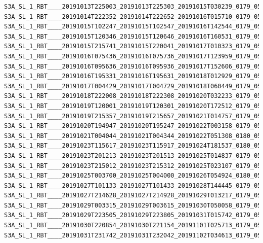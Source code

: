 \documentclass[sigplan,screen]{acmart}
\begin{document}
\begin{verbatim}
S3A_SL_1_RBT____20191013T225003_20191013T225303_20191015T030239_0179_050_201_0900_LN2_O_NT_003.hdf
S3A_SL_1_RBT____20191014T222352_20191014T222652_20191016T015710_0179_050_215_0900_LN2_O_NT_003.hdf
S3A_SL_1_RBT____20191015T102247_20191015T102547_20191016T142544_0179_050_222_1620_LN2_O_NT_003.hdf
S3A_SL_1_RBT____20191015T120346_20191015T120646_20191016T160531_0179_050_223_1620_LN2_O_NT_003.hdf
S3A_SL_1_RBT____20191015T215741_20191015T220041_20191017T010323_0179_050_229_0900_LN2_O_NT_003.hdf
S3A_SL_1_RBT____20191016T075436_20191016T075736_20191017T123959_0179_050_235_0360_LN2_O_NT_003.hdf
S3A_SL_1_RBT____20191016T095636_20191016T095936_20191017T152606_0179_050_236_1620_LN2_O_NT_003.hdf
S3A_SL_1_RBT____20191016T195331_20191016T195631_20191018T012929_0179_050_242_1080_LN2_O_NT_003.hdf
S3A_SL_1_RBT____20191017T004429_20191017T004729_20191018T060449_0179_050_245_0360_LN2_O_NT_003.hdf
S3A_SL_1_RBT____20191018T222008_20191018T222308_20191020T032233_0179_050_272_0900_LN2_O_NT_003.hdf
S3A_SL_1_RBT____20191019T120001_20191019T120301_20191020T172512_0179_050_280_1620_LN2_O_NT_003.hdf
S3A_SL_1_RBT____20191019T215357_20191019T215657_20191021T014757_0179_050_286_0900_LN2_O_NT_003.hdf
S3A_SL_1_RBT____20191020T194947_20191020T195247_20191022T003158_0179_050_299_1080_LN2_O_NT_003.hdf
S3A_SL_1_RBT____20191021T004044_20191021T004344_20191022T051308_0180_050_302_0360_LN2_O_NT_003.hdf
S3A_SL_1_RBT____20191023T115617_20191023T115917_20191024T181537_0180_050_337_1620_LN2_O_NT_003.hdf
S3A_SL_1_RBT____20191023T201213_20191023T201513_20191025T014837_0179_050_342_1080_LN2_O_NT_003.hdf
S3A_SL_1_RBT____20191023T215012_20191023T215312_20191025T023107_0179_050_343_0900_LN2_O_NT_003.hdf
S3A_SL_1_RBT____20191025T003700_20191025T004000_20191026T054924_0180_050_359_0360_LN2_O_NT_003.hdf
S3A_SL_1_RBT____20191027T101133_20191027T101433_20191028T144445_0179_051_008_1620_LN2_O_NT_003.hdf
S3A_SL_1_RBT____20191027T214628_20191027T214928_20191029T013217_0179_051_015_0900_LN2_O_NT_003.hdf
S3A_SL_1_RBT____20191029T003315_20191029T003615_20191030T050058_0179_051_031_0360_LN2_O_NT_003.hdf
S3A_SL_1_RBT____20191029T223505_20191029T223805_20191031T015742_0179_051_044_0900_LN2_O_NT_003.hdf
S3A_SL_1_RBT____20191030T220854_20191030T221154_20191101T025713_0179_051_058_0900_LN2_O_NT_003.hdf
S3A_SL_1_RBT____20191031T231742_20191031T232042_20191102T034613_0179_051_073_0540_LN2_O_NT_003.hdf
\end{verbatim}
\end{document}

